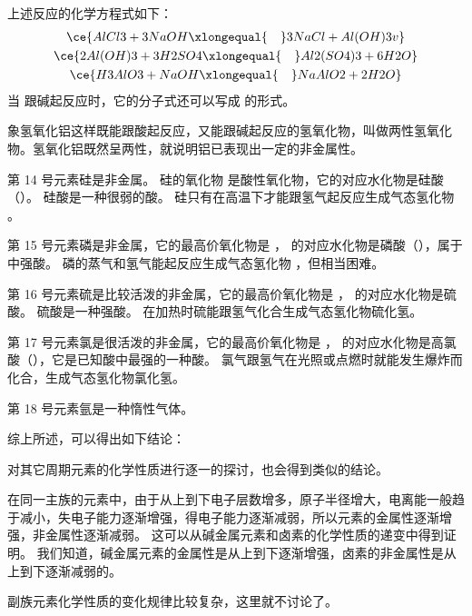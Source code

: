 上述反应的化学方程式如下：
\begin{gather*}
  \ce{ AlCl3 + 3NaOH \xlongequal{\quad} 3NaCl + Al(OH)3 v  } \\ 
  \ce{ 2Al(OH)3 + 3H2SO4 \xlongequal{\quad} Al2(SO4)3 + 6H2O}\\ 
  \ce{ H3AlO3 + NaOH \xlongequal{\quad} NaAlO2 + 2H2O}
\end{gather*}
当  跟碱起反应时，它的分子式还可以写成  的形式。

象氢氧化铝这样既能跟酸起反应，又能跟碱起反应的氢氧化物，叫做两性氢氧化物。氢氧化铝既然呈两性，就说明铝已表现出一定的非金属性。

第 14 号元素硅是非金属。
硅的氧化物  是酸性氧化物，它的对应水化物是硅酸（）。
硅酸是一种很弱的酸。 
硅只有在高温下才能跟氢气起反应生成气态氢化物 。

第 15 号元素磷是非金属，它的最高价氧化物是 ， 的对应水化物是磷酸（），属于中强酸。
磷的蒸气和氢气能起反应生成气态氢化物 ，但相当困难。

第 16 号元素硫是比较活泼的非金属，它的最高价氧化物是 ， 的对应水化物是硫酸。
硫酸是一种强酸。
在加热时硫能跟氢气化合生成气态氢化物硫化氢。

第 17 号元素氯是很活泼的非金属，它的最高价氧化物是 ， 的对应水化物是高氯酸（），它是已知酸中最强的一种酸。
氯气跟氢气在光照或点燃时就能发生爆炸而化合，生成气态氢化物氯化氢。

第 18 号元素氩是一种惰性气体。

综上所述，可以得出如下结论：
\begin{center}
\end{center}

对其它周期元素的化学性质进行逐一的探讨，也会得到类似的结论。

在同一主族的元素中，由于从上到下电子层数增多，原子半径增大，电离能一般趋于减小，失电子能力逐渐增强，得电子能力逐渐减弱，所以元素的金属性逐渐增强，非金属性逐渐减弱。
这可以从碱金属元素和卤素的化学性质的递变中得到证明。
我们知道，碱金属元素的金属性是从上到下逐渐增强，卤素的非金属性是从上到下逐渐减弱的。

副族元素化学性质的变化规律比较复杂，这里就不讨论了。

